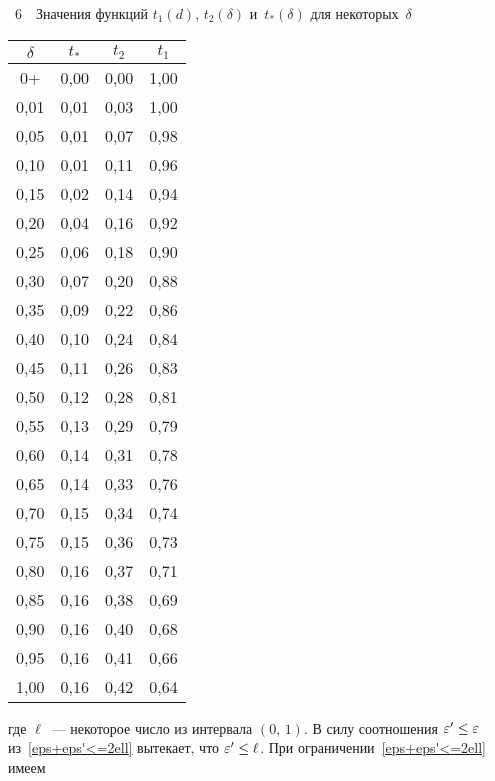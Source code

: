 \begin{multicols}{2}
\noindent %
\begin{center}
\parbox{74mm}{{\tablename~6}\ \ \small{Значения функций $t_1(d)$,
$t_2(\delta)$ и~$t_*(\delta)$ для некоторых~$\delta$}}
\end{center}

{\small
\begin{center}
\tabcolsep=18pt
\begin{tabular}{|c|c|c|c|}
\hline
$\delta$ & $t_*$ & $t_2$ & $t_1$ \\
\hline
 0+   & 0,00 & 0,00 & 1,00 \\
 0,01 & 0,01 & 0,03 & 1,00 \\
 0,05 & 0,01 & 0,07 & 0,98 \\
 0,10 & 0,01 & 0,11 & 0,96 \\
 0,15 & 0,02 & 0,14 & 0,94 \\
 0,20 & 0,04 & 0,16 & 0,92 \\
 0,25 & 0,06 & 0,18 & 0,90 \\
 0,30 & 0,07 & 0,20 & 0,88 \\
 0,35 & 0,09 & 0,22 & 0,86 \\
 0,40 & 0,10 & 0,24 & 0,84 \\
 0,45 & 0,11 & 0,26 & 0,83 \\
 0,50 & 0,12 & 0,28 & 0,81 \\
 0,55 & 0,13 & 0,29 & 0,79 \\
 0,60 & 0,14 & 0,31 & 0,78 \\
 0,65 & 0,14 & 0,33 & 0,76 \\
 0,70 & 0,15 & 0,34 & 0,74 \\
 0,75 & 0,15 & 0,36 & 0,73 \\
 0,80 & 0,16 & 0,37 & 0,71 \\
 0,85 & 0,16 & 0,38 & 0,69 \\
 0,90 & 0,16 & 0,40 & 0,68 \\
 0,95 & 0,16 & 0,41 & 0,66 \\
 1,00 & 0,16 & 0,42 & 0,64 \\
\hline
\end{tabular}
\end{center}
}
\vspace*{2pt}


\bigskip
\addtocounter{table}{1}


\noindent
где $\ell$~--- некоторое число из интервала $(0,\,1)$. В силу соотношения
$\varepsilon'\le\varepsilon$ из~\eqref{eps+eps'<=2ell} вытекает, что
$\varepsilon'\le\ell$. При ограничении~\eqref{eps+eps'<=2ell} имеем


\end{multicols}
